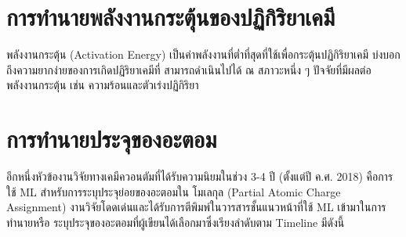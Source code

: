 \section{การทำนายพลังงานกระตุ้นของปฏิกิริยาเคมี}
\label{sec:pred_act_ener}

พลังงานกระตุ้น (Activation Energy) เป็นค่าพลังงานที่ต่ำที่สุดที่ใช้เพื่อกระตุ้นปฏิกิริยาเคมี บ่งบอกถึงความยากง่ายของการเกิดปฏิริยาเคมีที่%
สามารถดำเนินไปได้ ณ สภาวะหนึ่ง ๆ ปัจจัยที่มีผลต่อพลังงานกระตุ้น เช่น ความร้อนและตัวเร่งปฏิกิริยา

\section{การทำนายประจุของอะตอม}
\label{sec:pred_atomic_charge}

อีกหนึ่งหัวข้องานวิจัยทางเคมีควอนตัมที่ได้รับความนิยมในช่วง 3-4 ปี (ตั้งแต่ปี ค.ศ. 2018) คือการใช้ ML สำหรับการระบุประจุย่อยของอะตอมใน%
โมเลกุล (Partial Atomic Charge Assignment) งานวิจัยโดดเด่นและได้รับการตีพิมพ์ในวารสารชั้นแนวหน้าที่ใช้ ML เข้ามาในการทำนายหรือ%
ระบุประจุของอะตอมที่ผู้เขียนได้เลือกมาซึ่งเรียงลำดับตาม Timeline มีดังนี้

